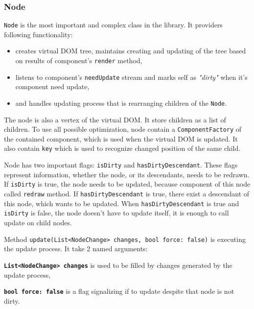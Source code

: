 \documentclass[oneside, 12pt]{book}
\begin{document}
    \subsubsection{Node}\label{subsubsec:our-architecture-core-node}
      \texttt{Node} is the most important and complex class in the library.
      It providers following functionality:
			\begin{itemize}
				\item creates virtual DOM tree, maintains creating and updating of the tree based on results of component's \texttt{render} method, 
				\item listens to component's \texttt{needUpdate} stream and marks self as \textit{"dirty"} when it's component need update,
				\item and handles updating process that is rearranging children of the \texttt{Node}.
			\end{itemize}

			The node is also a vertex of the virtual DOM. 
			It store children as a list of children. 
			To use all possible optimization, node contain a \texttt{ComponentFactory} of the contained component, which is used when the virtual DOM is updated.
			It also contain \texttt{key} which is used to recognize changed position of the same child.

      Node has two important flags: \texttt{isDirty} and \texttt{hasDirtyDescendant}. 
      These flags represent information, whether the node, or its descendants, needs to be redrawn.
      If \texttt{isDirty} is true, the node needs to be updated, 
      because component of this node called \texttt{redraw} method.
      If \texttt{hasDirtyDescendant} is true,  
      there exist a descendant of this node, which wants to be updated.
      When \texttt{hasDirtyDescendant} is true and \texttt{isDirty} is false, 
      the node doesn't have to update itself, it is enough to call update on child nodes.

			Method \texttt{update({List<NodeChange> changes, bool force: false})} is executing the update process. 
			It take 2 named arguments:
			\begin{description}
				\item{\textbf{\texttt{List<NodeChange> changes}}} is used to be filled by changes generated by the update process,
				\item{\textbf{\texttt{bool force: false}}} is a flag signalizing if to update despite that node is not dirty.
			\end{description}
\end{document}
